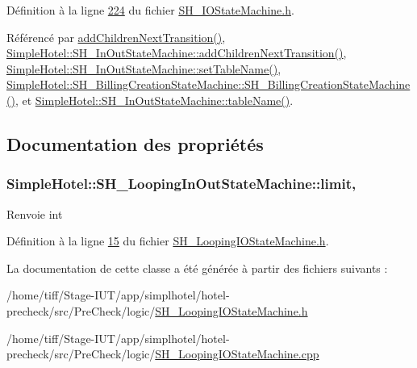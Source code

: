 Définition à la ligne \hyperlink{SH__IOStateMachine_8h_source_l00224}{224} du fichier \hyperlink{SH__IOStateMachine_8h_source}{S\-H\-\_\-\-I\-O\-State\-Machine.\-h}.



Référencé par \hyperlink{classSimpleHotel_1_1SH__LoopingInOutStateMachine_a2ac2ff43d97fd1b12e1b30d6818f33e4}{add\-Children\-Next\-Transition()}, \hyperlink{classSimpleHotel_1_1SH__InOutStateMachine_aaf5afe04d6e4d3d5ebf0b5f1b00eddf1}{Simple\-Hotel\-::\-S\-H\-\_\-\-In\-Out\-State\-Machine\-::add\-Children\-Next\-Transition()}, \hyperlink{classSimpleHotel_1_1SH__InOutStateMachine_adae23a212e9ba1e590f062994cd367a6}{Simple\-Hotel\-::\-S\-H\-\_\-\-In\-Out\-State\-Machine\-::set\-Table\-Name()}, \hyperlink{classSimpleHotel_1_1SH__BillingCreationStateMachine_a8c7d39e11d0ced1fd9c27a5550465b86}{Simple\-Hotel\-::\-S\-H\-\_\-\-Billing\-Creation\-State\-Machine\-::\-S\-H\-\_\-\-Billing\-Creation\-State\-Machine()}, et \hyperlink{classSimpleHotel_1_1SH__InOutStateMachine_a9fd170fd458e524ac0629b64d5323a45}{Simple\-Hotel\-::\-S\-H\-\_\-\-In\-Out\-State\-Machine\-::table\-Name()}.



\subsection{Documentation des propriétés}
\hypertarget{classSimpleHotel_1_1SH__LoopingInOutStateMachine_a5039255365e39a63520818168200b686}{
\subsubsection[{limit}]{\setlength{\rightskip}{0pt plus 5cm}Simple\-Hotel\-::\-S\-H\-\_\-\-Looping\-In\-Out\-State\-Machine\-::limit\hspace{0.3cm}{\ttfamily [read]}, {\ttfamily [write]}}}\label{classSimpleHotel_1_1SH__LoopingInOutStateMachine_a5039255365e39a63520818168200b686}
\begin{DoxyReturn}{Renvoie}
int 
\end{DoxyReturn}


Définition à la ligne \hyperlink{SH__LoopingIOStateMachine_8h_source_l00015}{15} du fichier \hyperlink{SH__LoopingIOStateMachine_8h_source}{S\-H\-\_\-\-Looping\-I\-O\-State\-Machine.\-h}.



La documentation de cette classe a été générée à partir des fichiers suivants \-:\begin{DoxyCompactItemize}
\item 
/home/tiff/\-Stage-\/\-I\-U\-T/app/simplhotel/hotel-\/precheck/src/\-Pre\-Check/logic/\hyperlink{SH__LoopingIOStateMachine_8h}{S\-H\-\_\-\-Looping\-I\-O\-State\-Machine.\-h}\item 
/home/tiff/\-Stage-\/\-I\-U\-T/app/simplhotel/hotel-\/precheck/src/\-Pre\-Check/logic/\hyperlink{SH__LoopingIOStateMachine_8cpp}{S\-H\-\_\-\-Looping\-I\-O\-State\-Machine.\-cpp}\end{DoxyCompactItemize}
